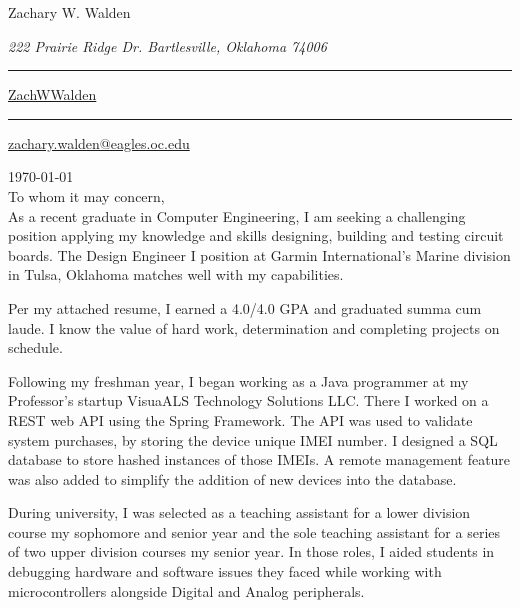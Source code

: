 \documentclass{article}
\newcommand\mybar{\kern1pt\rule[-\dp\strutbox]{.8pt}{\baselineskip}\kern1pt}
\begin{document}
\begin{center}
	\begin{Huge}
		Zachary W. Walden\\
	\end{Huge}
	\begin{large}
		\textsl{222 Prairie Ridge Dr. Bartlesville, Oklahoma 74006}\\
	\end{large}
	\begin{normalsize}
		 \mybar { } \faGithub \href{https://github.com/ZachWWalden}{ ZachWWalden}
		\mybar { }\faEnvelope\href{mailto::zachary.walden@eagles.oc.edu}{ zachary.walden@eagles.oc.edu}
	\end{normalsize}
\end{center}

\begin{adjustwidth}{70pt}{70pt}
\begin{spacing}{1.25}
\vspace*{1.5cm}

\today
\vspace*{.6cm}
\\To whom it may concern,\\

As a recent graduate in Computer Engineering, I am seeking a challenging position applying my knowledge
and  skills designing, building and testing circuit boards. The Design Engineer I position at Garmin International's Marine division in Tulsa, Oklahoma
matches well with my capabilities.

Per my attached resume, I earned a 4.0/4.0 GPA and graduated summa cum laude. I know the value of hard
work, determination and completing projects on schedule.

Following my freshman year, I began working as a Java programmer at my Professor's startup VisuaALS Technology Solutions LLC. There I worked on a REST web API using the Spring Framework. The API was used to validate system purchases, by storing the device unique IMEI number. I designed a SQL database to store hashed instances of those IMEIs. A remote management feature was also added to simplify the addition of new devices into the database.

During university, I was selected as a teaching assistant for a lower division course my sophomore and senior year and the sole teaching assistant for a series of two upper division courses my senior year.
In those roles, I aided students in debugging hardware and software issues they faced while working with microcontrollers alongside Digital and Analog peripherals.


\end{spacing}
\end{adjustwidth}
\end{document}
